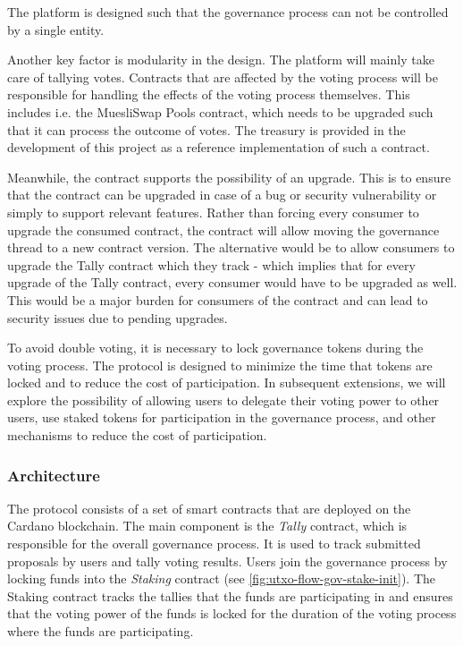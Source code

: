 \documentclass[11pt]{article}
\begin{document}
The platform is designed such that the governance process can not be controlled by a single entity.

Another key factor is modularity in the design.
The platform will mainly take care of tallying votes.
Contracts that are affected by the voting process will be responsible for handling the effects of the voting process themselves.
This includes i.e. the MuesliSwap Pools contract, which needs to be upgraded such that it can process the outcome of votes.
The treasury is provided in the development of this project as a reference implementation of such a contract.

Meanwhile, the contract supports the possibility of an upgrade.
This is to ensure that the contract can be upgraded in case of a bug or security vulnerability or simply to support
relevant features.
Rather than forcing every consumer to upgrade the consumed contract,
the contract will allow moving the governance thread to a new contract version.
The alternative would be to allow consumers to upgrade the Tally contract which they track -
which implies that for every upgrade of the Tally contract, every consumer would have to be upgraded as well.
This would be a major burden for consumers of the contract and can lead to security issues due to pending upgrades.

To avoid double voting, it is necessary to lock governance tokens during the voting process.
The protocol is designed to minimize the time that tokens are locked and to reduce the cost of participation.
In subsequent extensions, we will explore the possibility of allowing users to delegate their voting power to other users,
use staked tokens for participation in the governance process, and other mechanisms to reduce the cost of participation.

\subsubsection{Architecture}
\label{sec:architecture}

The protocol consists of a set of smart contracts that are deployed on the Cardano blockchain.
The main component is the \emph{Tally} contract, which is responsible for the overall governance process.
It is used to track submitted proposals by users and tally voting results.
Users join the governance process by locking funds into the \emph{Staking} contract (see \cref{fig:utxo-flow-gov-stake-init}).
The Staking contract tracks the tallies that the funds are participating in and ensures that
the voting power of the funds is locked for the duration of the voting process where the funds are participating.
\end{document}
